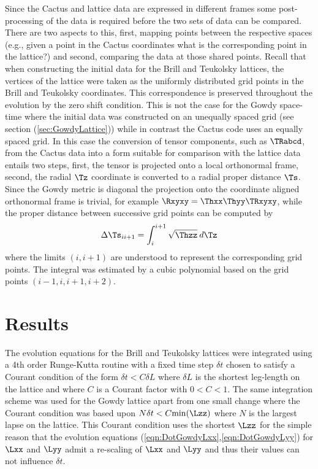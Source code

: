 \documentclass[a4paper,12pt]{article}
\numberwithin{equation}{section}
\begin{document}
Since the Cactus and lattice data are expressed in different frames some post-processing of
the data is required before the two sets of data can be compared. There are two aspects to
this, first, mapping points between the respective spaces (e.g., given a point in the Cactus
coordinates what is the corresponding point in the lattice?) and second, comparing the data
at those shared points. Recall that when constructing the initial data for the Brill and
Teukolsky lattices, the vertices of the lattice were taken as the uniformly distributed grid
points in the Brill and Teukolsky coordinates. This correspondence is preserved throughout
the evolution by the zero shift condition. This is not the case for the Gowdy space-time
where the initial data was constructed on an unequally spaced grid (see section
(\ref{sec:GowdyLattice})) while in contrast the Cactus code uses an equally spaced grid. In
this case the conversion of tensor components, such as $\TRabcd$, from the Cactus data into
a form suitable for comparison with the lattice data entails two steps, first, the tensor
is projected onto a local orthonormal frame, second, the radial $\Tz$ coordinate is
converted to a radial proper distance $\Ts$. Since the Gowdy metric is diagonal the
projection onto the coordinate aligned orthonormal frame is trivial, for example $\Rxyxy =
\Thxx \Thyy \TRxyxy$, while the proper distance between successive grid points can be
computed by
\begin{align}
   \Delta \Ts_{ii+1} = \int_i^{i+1} \sqrt{\Thzz}\>d\Tz
\end{align}
where the limits $(i,i+1)$ are understood to represent the corresponding grid points.
The integral was estimated by a cubic polynomial based on the grid points
$(i-1,i,i+1,i+2)$.

\section{Results}
\label{sec:Results}

The evolution equations for the Brill and Teukolsky lattices were integrated using a 4th
order Runge-Kutta routine with a fixed time step $\delta t$ chosen to satisfy a Courant
condition of the form $\delta t < C\delta L$ where $\delta L$ is the shortest leg-length on
the lattice and where $C$ is a Courant factor with $0<C<1$. The same integration scheme was
used for the Gowdy lattice apart from one small change where the Courant condition was based
upon $N\delta t < C{\rm min}(\Lzz)$ where $N$ is the largest lapse on the lattice. This
Courant condition uses the shortest $\Lzz$ for the simple reason that the evolution
equations (\ref{eqn:DotGowdyLxx},\ref{eqn:DotGowdyLyy}) for $\Lxx$ and $\Lyy$ admit a
re-scaling of $\Lxx$ and $\Lyy$ and thus their values can not influence $\delta t$.
\end{document}
